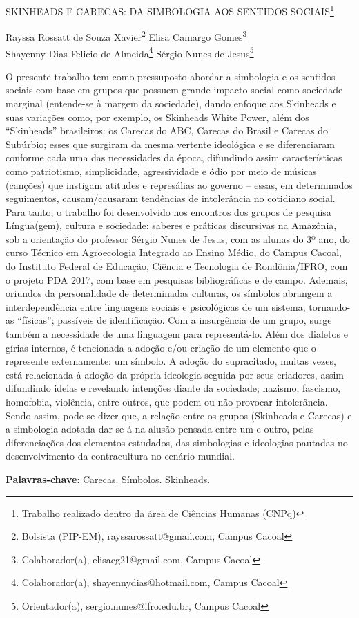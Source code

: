 \documentclass[article,12pt,onesidea,4paper,english,brazil]{abntex2}
\begin{document}
	
	
	\frenchspacing 
	
	\begin{center}
		\LARGE SKINHEADS E CARECAS: DA SIMBOLOGIA AOS SENTIDOS SOCIAIS\footnote{Trabalho realizado dentro da área de Ciências Humanas (CNPq)}
		
		\normalsize
		Rayssa Rossatt de Souza Xavier\footnote{Bolsista (PIP-EM), rayssarossatt@gmail.com, Campus Cacoal} 
	Elisa Camargo Gomes\footnote{Colaborador(a), elisacg21@gmail.com, Campus Cacoal} \\
		Shayenny Dias Felicio de Almeida\footnote{Colaborador(a), shayennydias@hotmail.com, Campus Cacoal} 
	Sérgio Nunes de Jesus\footnote{Orientador(a), sergio.nunes@ifro.edu.br, Campus Cacoal} 
	\end{center}
	
	\noindent O presente trabalho tem como pressuposto abordar a simbologia e os sentidos sociais com base em grupos que possuem grande impacto social como sociedade marginal (entende-se à margem da sociedade), dando enfoque aos Skinheads e suas variações como, por exemplo, os Skinheads White Power, além dos “Skinheads” brasileiros: os Carecas do ABC, Carecas do Brasil e Carecas do Subúrbio; esses que surgiram da mesma vertente ideológica e se diferenciaram conforme cada uma das necessidades da época, difundindo assim características como patriotismo, simplicidade, agressividade e ódio por meio de músicas (canções) que instigam atitudes e represálias ao governo – essas, em determinados seguimentos, causam/causaram tendências de intolerância no cotidiano social. Para tanto, o trabalho foi desenvolvido nos encontros dos grupos de pesquisa Língua(gem), cultura e sociedade: saberes e práticas discursivas na Amazônia, sob a orientação do professor Sérgio Nunes de Jesus, com as alunas do 3º ano, do curso Técnico em Agroecologia Integrado ao Ensino Médio, do Campus Cacoal, do Instituto Federal de Educação, Ciência e Tecnologia de Rondônia/IFRO, com o projeto PDA 2017, com base em pesquisas bibliográficas e de campo. Ademais, oriundos da personalidade de determinadas culturas, os símbolos abrangem a interdependência entre linguagens sociais e psicológicas de um sistema, tornando-as “físicas”; passíveis de identificação. Com a insurgência de um grupo, surge também a necessidade de uma linguagem para representá-lo. Além dos dialetos e gírias internos, é tencionada a adoção e/ou criação de um elemento que o represente externamente: um símbolo. A adoção do supracitado, muitas vezes, está relacionada à adoção da própria ideologia seguida por seus criadores, assim difundindo ideias e revelando intenções diante da sociedade; nazismo, fascismo, homofobia, violência, entre outros, que podem ou não provocar intolerância. Sendo assim, pode-se dizer que, a relação entre os grupos (Skinheads e Carecas) e a simbologia adotada dar-se-á na alusão pensada entre um e outro, pelas diferenciações dos elementos estudados, das simbologias e ideologias pautadas no desenvolvimento da contracultura no cenário mundial.
	
	\vspace{\onelineskip}
	
	\noindent
	\textbf{Palavras-chave}: Carecas. Símbolos. Skinheads.
	
\end{document}
